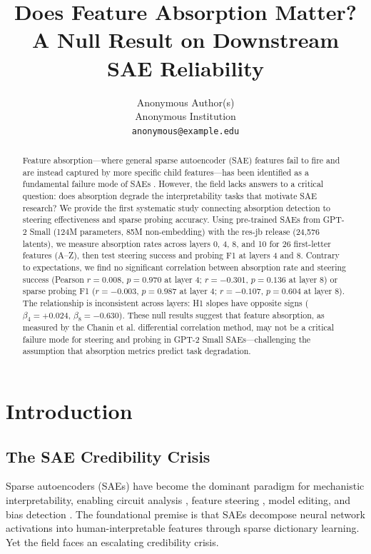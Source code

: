 \documentclass{article}
\title{Does Feature Absorption Matter? A Null Result on Downstream SAE Reliability}
\author{%
  Anonymous Author(s) \\
  Anonymous Institution \\
  \texttt{anonymous@example.edu}
}
\begin{document}
\maketitle

\begin{abstract}
Feature absorption---where general sparse autoencoder (SAE) features fail to fire and are instead captured by more specific child features---has been identified as a fundamental failure mode of SAEs \cite{chanin2024quantifying}. However, the field lacks answers to a critical question: does absorption degrade the interpretability tasks that motivate SAE research? We provide the first systematic study connecting absorption detection to steering effectiveness and sparse probing accuracy. Using pre-trained SAEs from GPT-2 Small (124M parameters, 85M non-embedding) with the res-jb release (24,576 latents), we measure absorption rates across layers 0, 4, 8, and 10 for 26 first-letter features (A--Z), then test steering success and probing F1 at layers 4 and 8. Contrary to expectations, we find no significant correlation between absorption rate and steering success (Pearson $r = 0.008$, $p = 0.970$ at layer 4; $r = -0.301$, $p = 0.136$ at layer 8) or sparse probing F1 ($r = -0.003$, $p = 0.987$ at layer 4; $r = -0.107$, $p = 0.604$ at layer 8). The relationship is inconsistent across layers: H1 slopes have opposite signs ($\beta_4 = +0.024$, $\beta_8 = -0.630$). These null results suggest that feature absorption, as measured by the Chanin et al. differential correlation method, may not be a critical failure mode for steering and probing in GPT-2 Small SAEs---challenging the assumption that absorption metrics predict task degradation.
\end{abstract}

\section{Introduction}

\subsection{The SAE Credibility Crisis}

Sparse autoencoders (SAEs) have become the dominant paradigm for mechanistic interpretability, enabling circuit analysis \cite{marks2024sparse}, feature steering \cite{rimsky2024steering}, model editing, and bias detection \cite{templeton2024scaling}. The foundational premise is that SAEs decompose neural network activations into human-interpretable features through sparse dictionary learning. Yet the field faces an escalating credibility crisis.
\end{document}
